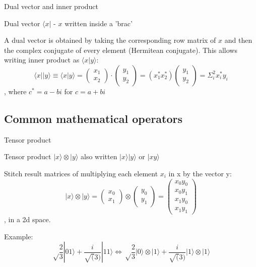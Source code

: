 \documentclass[svgnames,smaller]{beamer}
\begin{document}
\begin{frame}[fragile]{Dual vector and inner product}
    \begin{block}{Dual vector}
       $\langle x |$ - $x$ written inside a 'brac'
    \end{block}
  A dual vector is obtained by taking the corresponding row matrix of $x$ and then the complex conjugate of every element (Hermitean conjugate). This allows writing inner product as $\langle x | y \rangle$:
$$\langle x || y \rangle \equiv \langle x | y \rangle = \begin{pmatrix} x_1 \\ x_2 \end{pmatrix}
  \cdot \begin{pmatrix} y_1 \\ y_2 \end{pmatrix} = (x_1^* x_2^*)\begin{pmatrix} y_1 \\ y_2 \end{pmatrix} = \Sigma_i^2x_i^* y_i$$ ,
    where $c^*=a-bi$  for  $c=a+bi$
\end{frame}

\subsection{Common mathematical operators}

\begin{frame}[fragile]{Tensor product}
  \begin{block}{Tensor product}
   $|x\rangle\otimes|y\rangle$ also written $|x\rangle|y\rangle$ or $|xy\rangle$
  \end{block}
  Stitch result matrices of multiplying each element $x_i$ in x by the vector y:
$$|x\rangle\otimes|y\rangle = \begin{pmatrix} x_0 \\ x_1 \end{pmatrix} \otimes \begin{pmatrix} y_0 \\ y_1 \end{pmatrix}
  = \begin{pmatrix} x_0 y_0 \\ x_0 y_1 \\ x_1 y_0 \\ x_1 y_1 \end{pmatrix}$$, in a 2d space.
  
Example: $$\sqrt\frac{2}{3}|01\rangle + \frac{i}{\sqrt(3)}|11\rangle \Longleftrightarrow \sqrt\frac{2}{3}|0\rangle\otimes|1\rangle + \frac{i}{\sqrt(3)}|1\rangle\otimes|1\rangle$$
\end{frame}
\end{document}

